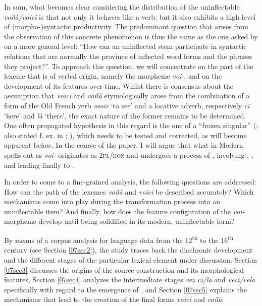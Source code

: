 \documentclass[output=paper,colorlinks,citecolor=brown]{langscibook}
\begin{document}
In sum, what becomes clear considering the distribution of the uninflectable \emph{voilà/voici} is that not only it behaves like a verb, but it also exhibits a high level of (morpho-)syntactic productivity. The predominant question that arises from the observation of this concrete phenomenon is thus the same as the one asked by \citet[154]{spencer2020} on a more general level: ``How can an uninflected stem participate in syntactic relations that are normally the province of inflected word forms and the phrases they project?''. To approach this question, we will concentrate on the part of the lexeme that is of verbal origin, namely the morpheme \emph{voi-}, and on the development of its features over time. Whilst there is consensus about the assumption that \emph{voici} and \emph{voilà} etymologically arose from the combination of a form of the Old French verb \emph{veoir} `to see' and a locative adverb, respectively \emph{ci} `here' and \emph{là} `there', the exact nature of the former remains to be determined. One often propagated hypothesis in this regard is the one of a ``frozen  singular'' (\citealt[243]{buridant2000}; also stated f. ex. in \citealt[141]{rabatel2001}; \citealt[vol. 14, 492]{few1922}), which needs to be tested and corrected, as will become apparent below. In the course of the paper, I will argue that what in Modern  spells out as \emph{voi-} originates as \textsc{2pl/hon} and undergoes a process of , involving , , and  leading finally to .

In order to come to a fine-grained analysis, the following questions are addressed: How can the  path of the lexemes \emph{voilà} and \emph{voici} be described accurately? Which mechanisms come into play during the transformation process into an uninflectable item? And finally, how does the feature configuration of the \emph{voi-}morpheme develop until being solidified in its modern, uninflectable form?

By means of a corpus analysis for  language data from the 12\textsuperscript{th} to the 16\textsuperscript{th} century (see Section \ref{07sec2}), the study traces back the diachronic development and the
different stages of the particular lexical element under discussion. Section \ref{07sec3} discusses the origins of the source construction and its morphological features, Section \ref{07sec4} analyzes the intermediate stages
\emph{vez ci/la} and \emph{veci/vela} specifically with regard to the emergence of , and Section \ref{07sec5} explains the mechanisms that lead to the creation of the final forms \emph{voici} and \emph{voilà}.
\end{document}
